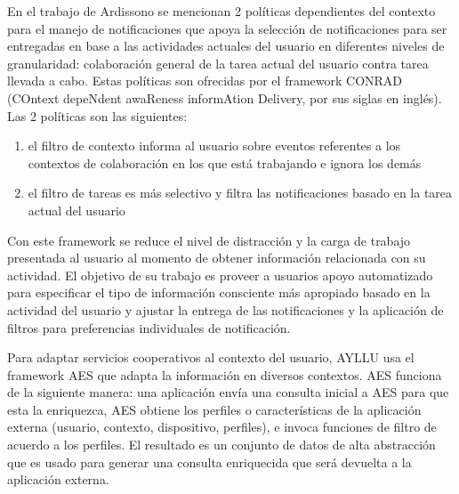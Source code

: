 En el trabajo de Ardissono \cite{ardissono2012context} se mencionan 2 pol\'iticas dependientes del contexto para el manejo de notificaciones que apoya la selecci\'on de notificaciones para ser entregadas en base a las actividades actuales del usuario en diferentes niveles de granularidad: colaboraci\'on general de la tarea actual del usuario contra tarea llevada a cabo. Estas pol\'iticas son ofrecidas por el framework CONRAD (COntext depeNdent awaReness informAtion Delivery, por sus siglas en ingl\'es). Las 2 pol\'iticas son las siguientes:

\begin{enumerate}
\item el filtro de contexto informa al usuario sobre eventos referentes a los contextos de colaboraci\'on en los que est\'a trabajando e ignora los dem\'as
\item el filtro de tareas es m\'as selectivo y filtra las notificaciones basado en la tarea actual del usuario
\end{enumerate}

Con este framework se reduce el nivel de distracci\'on y la carga de trabajo presentada al usuario al momento de obtener informaci\'on relacionada con su actividad.
El objetivo de su trabajo es proveer a usuarios apoyo automatizado para especificar el tipo de informaci\'on consciente m\'as apropiado basado en la actividad del usuario y ajustar la entrega de las notificaciones y la aplicaci\'on de filtros para preferencias individuales de notificaci\'on.

Para adaptar servicios cooperativos al contexto del usuario, AYLLU \cite{arias2012platform} usa el framework AES que adapta la informaci\'on en diversos contextos. AES funciona de la siguiente manera: una aplicaci\'on env\'ia una consulta inicial a AES para que esta la enriquezca, AES obtiene los perfiles o caracter\'isticas de la aplicaci\'on externa (usuario, contexto, dispositivo, perfiles), e invoca funciones de filtro de acuerdo a los perfiles. El resultado es un conjunto de datos de alta abstracci\'on que es usado para generar una consulta enriquecida que ser\'a devuelta a la aplicaci\'on externa.

